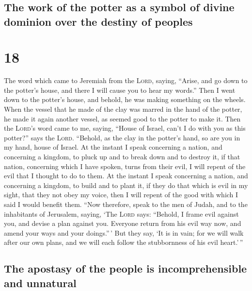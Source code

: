 \hypertarget{the-work-of-the-potter-as-a-symbol-of-divine-dominion-over-the-destiny-of-peoples}{%
\subsection{The work of the potter as a symbol of divine dominion over
the destiny of
peoples}\label{the-work-of-the-potter-as-a-symbol-of-divine-dominion-over-the-destiny-of-peoples}}

\hypertarget{section-17}{%
\section{18}\label{section-17}}

 The word which came to Jeremiah from the \textsc{Lord},
saying,  ``Arise, and go down to the potter's house, and
there I will cause you to hear my words.''  Then I went
down to the potter's house, and behold, he was making something on the
wheels.  When the vessel that he made of the clay was
marred in the hand of the potter, he made it again another vessel, as
seemed good to the potter to make it.  Then the
\textsc{Lord}'s word came to me, saying,  ``House of
Israel, can't I do with you as this potter?'' says the \textsc{Lord}.
``Behold, as the clay in the potter's hand, so are you in my hand, house
of Israel.  At the instant I speak concerning a nation,
and concerning a kingdom, to pluck up and to break down and to destroy
it,  if that nation, concerning which I have spoken, turns
from their evil, I will repent of the evil that I thought to do to them.
 At the instant I speak concerning a nation, and
concerning a kingdom, to build and to plant it,  if they
do that which is evil in my sight, that they not obey my voice, then I
will repent of the good with which I said I would benefit them.
 ``Now therefore, speak to the men of Judah, and to the
inhabitants of Jerusalem, saying, `The \textsc{Lord} says: ``Behold, I
frame evil against you, and devise a plan against you. Everyone return
from his evil way now, and amend your ways and your doings.''\,'
 But they say, `It is in vain; for we will walk after our
own plans, and we will each follow the stubbornness of his evil
heart.'\,''

\hypertarget{the-apostasy-of-the-people-is-incomprehensible-and-unnatural}{%
\subsection{The apostasy of the people is incomprehensible and
unnatural}\label{the-apostasy-of-the-people-is-incomprehensible-and-unnatural}}

